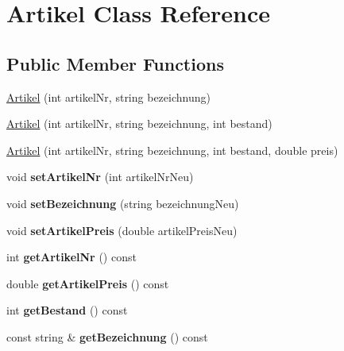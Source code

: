 \hypertarget{class_artikel}{\section{Artikel Class Reference}
\label{class_artikel}
}
\subsection*{Public Member Functions}
\begin{DoxyCompactItemize}
\item 
\hyperlink{class_artikel_a1770a6d63d0015ba2b3222d589695228}{Artikel} (int artikel\-Nr, string bezeichnung)
\item 
\hyperlink{class_artikel_af7e53e1f156aa25633d3d06a0b0a6cb6}{Artikel} (int artikel\-Nr, string bezeichnung, int bestand)
\item 
\hyperlink{class_artikel_a55bea20b3216ca80e6b7d1bde2290922}{Artikel} (int artikel\-Nr, string bezeichnung, int bestand, double preis)
\item 
\hypertarget{class_artikel_a44a94786106ffbdbde83a008d8029e32}{void {\bfseries set\-Artikel\-Nr} (int artikel\-Nr\-Neu)}\label{class_artikel_a44a94786106ffbdbde83a008d8029e32}

\item 
\hypertarget{class_artikel_ae620278a386e5b1515462ab42dbff1d0}{void {\bfseries set\-Bezeichnung} (string bezeichnung\-Neu)}\label{class_artikel_ae620278a386e5b1515462ab42dbff1d0}

\item 
\hypertarget{class_artikel_aa19a8e0be84324054db4b44ead00691c}{void {\bfseries set\-Artikel\-Preis} (double artikel\-Preis\-Neu)}\label{class_artikel_aa19a8e0be84324054db4b44ead00691c}

\item 
\hypertarget{class_artikel_a468d4f1867393f4e7d026f1baf95808d}{int {\bfseries get\-Artikel\-Nr} () const }\label{class_artikel_a468d4f1867393f4e7d026f1baf95808d}

\item 
\hypertarget{class_artikel_a7c3f818ddc4370f4c361a409ff60a600}{double {\bfseries get\-Artikel\-Preis} () const }\label{class_artikel_a7c3f818ddc4370f4c361a409ff60a600}

\item 
\hypertarget{class_artikel_aab1675e753843c85b2f3105c5c9dd460}{int {\bfseries get\-Bestand} () const }\label{class_artikel_aab1675e753843c85b2f3105c5c9dd460}

\item 
\hypertarget{class_artikel_ab173b70277cac21450acd4bdc941408f}{const string \& {\bfseries get\-Bezeichnung} () const }\label{class_artikel_ab173b70277cac21450acd4bdc941408f}


\end{DoxyCompactItemize}
